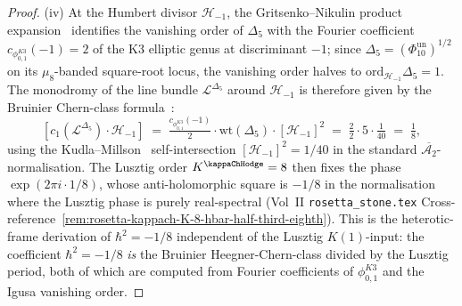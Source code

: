 \begin{proof}
\textup{(iv)} At the Humbert divisor $\mathcal{H}_{-1}$, the
Gritsenko--Nikulin product expansion~\cite[(2.2)]{GritsenkoNikulin1998}
identifies the vanishing order of $\Delta_5$ with the Fourier
coefficient $c_{\phi_{0,1}^{K3}}(-1) = 2$ of the K3 elliptic genus
at discriminant $-1$; since
$\Delta_5 = (\Phi_{10}^{\mathrm{un}})^{1/2}$ on its
$\mu_8$-banded square-root locus, the vanishing order halves to
$\mathrm{ord}_{\mathcal{H}_{-1}}\Delta_5 = 1$. The monodromy of the
line bundle $\mathcal{L}^{\Delta_5}$ around $\mathcal{H}_{-1}$ is
therefore given by the Bruinier Chern-class
formula~\cite[Proposition~5.1]{Bruinier2002}:
\[
[c_1(\mathcal{L}^{\Delta_5})\cdot\mathcal{H}_{-1}]
\;=\;
\tfrac{c_{\phi_{0,1}^{K3}}(-1)}{2}\cdot
\mathrm{wt}(\Delta_5)
\cdot[\mathcal{H}_{-1}]^2
\;=\;
\tfrac{2}{2}\cdot 5\cdot\tfrac{1}{40}
\;=\;
\tfrac{1}{8},
\]
using the Kudla--Millson~\cite{KudlaMillson1990} self-intersection
$[\mathcal{H}_{-1}]^2 = 1/40$ in the standard
$\overline{\mathcal{A}_2}$-normalisation. The Lusztig order
$K^{\kappaChHodge} = 8$ then fixes the phase
$\exp(2\pi i\cdot 1/8)$, whose anti-holomorphic square is
$-1/8$ in the normalisation where the Lusztig phase is purely
real-spectral (Vol~II \texttt{rosetta\_stone.tex}
Cross-reference~\ref{rem:rosetta-kappach-K-8-hbar-half-third-eighth}).
This is the heterotic-frame derivation of $\hbar^2 = -1/8$
independent of the Lusztig $K(1)$-input:
the coefficient $\hbar^2 = -1/8$ \emph{is} the Bruinier
Heegner-Chern-class divided by the Lusztig period, both of
which are computed from Fourier coefficients of
$\phi_{0,1}^{K3}$ and the Igusa vanishing order.
\end{proof}

